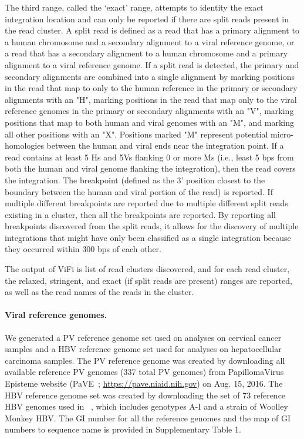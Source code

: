 \documentclass[a4,center,fleqn]{NAR}
\begin{document}
The third range, called the `exact' range, attempts to identity the exact integration location and can only be reported if there are split reads present in the read cluster.  A split read is defined as a read that has a primary alignment to a human chromosome and a secondary alignment to a viral reference genome, or a read that has a secondary alignment to a human chromosome and a primary alignment to a viral reference genome.  If a split read is detected, the primary and secondary alignments are combined into a single alignment by marking positions in the read that map to only to the human reference in the primary or secondary alignments with an "H", marking positions in the read  that map only to the viral reference genomes in the primary or secondary alignments with an "V", marking positions that map to both human and viral genomes with an "M", and marking all other positions with an "X".  Positions marked "M" represent potential micro-homologies between the human and viral ends near the integration point.  If a read contains at least 5 Hs and 5Vs flanking 0 or more Ms (i.e., least 5 bps from both the human and viral genome flanking the integration), then the read covers the integration.  The breakpoint (defined as the 3' position closest to the boundary between the human and viral portion of the read) is reported.  If multiple different breakpoints are reported due to multiple different split reads existing in a cluster, then all the breakpoints are reported.  By reporting all breakpoints discovered from the split reads, it allows for the discovery of multiple integrations that might have only been classified as a single integration because they occurred within 300 bps of each other.

The output of ViFi is list of read clusters discovered, and for each read cluster, the relaxed, stringent, and exact (if split reads are present) ranges are reported, as well as the read names of the reads in the cluster.  

\paragraph{\textbf{Viral reference genomes.}}
We generated a PV reference genome set used on analyses on cervical cancer samples and a HBV reference genome set used for analyses on hepatocellular carcinoma samples.  The PV reference genome was created by downloading all available reference PV genomes (337 total PV genomes) from PapillomaVirus Episteme website (PaVE~\cite{VanDoorslaer2017}; \href{https://pave.niaid.nih.gov}{https://pave.niaid.nih.gov}) on Aug. 15, 2016.  The HBV reference genome set was created by downloading the set of 73 reference HBV genomes used in ~\cite{Jiang2012}, which includes genotypes A-I and a strain of Woolley Monkey HBV.  The GI number for all the reference genomes and the map of GI numbers to sequence name is provided in Supplementary Table 1.  
\end{document}
